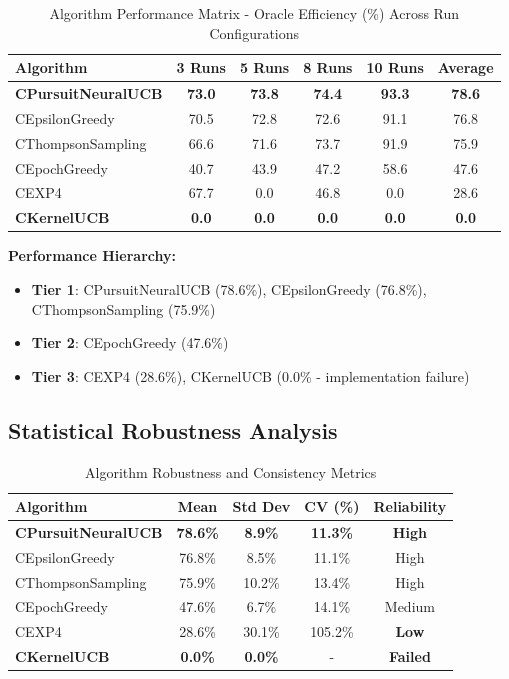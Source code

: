\documentclass[12pt,a4paper]{article}
\newcommand{\primarytext}[1]{\textcolor{primaryblue}{\textbf{#1}}}
\newcommand{\success}[1]{\textcolor{accentgreen}{\textbf{#1}}}
\newcommand{\warning}[1]{\textcolor{warningred}{\textbf{#1}}}
\begin{document}
\begin{table}[H]
\centering
\caption{Algorithm Performance Matrix - Oracle Efficiency (\%) Across Run Configurations}
\label{tab:performance_matrix}
\begin{tabular}{@{}lccccc@{}}
\toprule
\textbf{Algorithm} & \textbf{3 Runs} & \textbf{5 Runs} & \textbf{8 Runs} & \textbf{10 Runs} & \textbf{Average} \\
\midrule
\primarytext{CPursuitNeuralUCB} & \primarytext{73.0} & \primarytext{73.8} & \primarytext{74.4} & \primarytext{93.3} & \primarytext{78.6} \\
CEpsilonGreedy & 70.5 & 72.8 & 72.6 & 91.1 & 76.8 \\
CThompsonSampling & 66.6 & 71.6 & 73.7 & 91.9 & 75.9 \\
CEpochGreedy & 40.7 & 43.9 & 47.2 & 58.6 & 47.6 \\
CEXP4 & 67.7 & 0.0 & 46.8 & 0.0 & 28.6 \\
\warning{CKernelUCB} & \warning{0.0} & \warning{0.0} & \warning{0.0} & \warning{0.0} & \warning{0.0} \\
\bottomrule
\end{tabular}
\end{table}

\textbf{Performance Hierarchy:}
\begin{itemize}
\item \success{Tier 1}: CPursuitNeuralUCB (78.6\%), CEpsilonGreedy (76.8\%), CThompsonSampling (75.9\%)
\item \warning{Tier 2}: CEpochGreedy (47.6\%)
\item \warning{Tier 3}: CEXP4 (28.6\%), CKernelUCB (0.0\% - implementation failure)
\end{itemize}

\subsection{Statistical Robustness Analysis}

\begin{table}[H]
\centering
\caption{Algorithm Robustness and Consistency Metrics}
\label{tab:robustness}
\begin{tabular}{@{}lcccc@{}}
\toprule
\textbf{Algorithm} & \textbf{Mean} & \textbf{Std Dev} & \textbf{CV (\%)} & \textbf{Reliability} \\
\midrule
\success{CPursuitNeuralUCB} & \success{78.6\%} & \success{8.9\%} & \success{11.3\%} & \success{High} \\
CEpsilonGreedy & 76.8\% & 8.5\% & 11.1\% & High \\
CThompsonSampling & 75.9\% & 10.2\% & 13.4\% & High \\
CEpochGreedy & 47.6\% & 6.7\% & 14.1\% & Medium \\
CEXP4 & 28.6\% & 30.1\% & 105.2\% & \warning{Low} \\
\warning{CKernelUCB} & \warning{0.0\%} & \warning{0.0\%} & - & \warning{Failed} \\
\bottomrule
\end{tabular}
\end{table}
\end{document}
